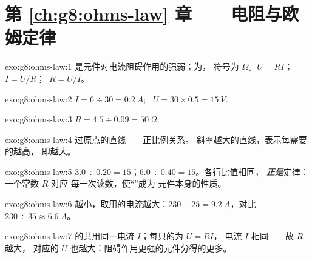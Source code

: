 \section*{第 \ref{ch:g8:ohms-law} 章——电阻与欧姆定律}

\begin{solution}{exo:g8:ohms-law:1}
是元件对电流阻碍作用的强弱；为，
符号为 $\Omega$。$U = R I$；\ $I = U/R$；\ $R = U/I$。
\end{solution}

\begin{solution}{exo:g8:ohms-law:2}
$I = 6 \div 30 = \qty{0.2}{A}$; \ $U = 30 \times 0.5 =
\qty{15}{V}$.
\end{solution}

\begin{solution}{exo:g8:ohms-law:3}
$R = 4.5 \div 0.09 = 50\,\Omega$.
\end{solution}

\begin{solution}{exo:g8:ohms-law:4}
过原点的直线——正比例关系。
斜率越大的直线，表示每需要的越高，
即越大。
\end{solution}

\begin{solution}{exo:g8:ohms-law:5}
$3.0 \div 0.20 = 15$；$6.0 \div 0.40 = 15$。各行比值相同，
\emph{正是}定律：一个常数 $R$ 对应
每一次读数，使“”成为
元件本身的性质。
\end{solution}

\begin{solution}{exo:g8:ohms-law:6}
越小，取用的电流越大：$230 \div 25 =
\qty{9.2}{A}$，对比 $230 \div 35 \approx \qty{6.6}{A}$。
\end{solution}

\begin{solution}{exo:g8:ohms-law:7}
的共用同一电流 $I$；每只的为 $U = R I$，
电流 $I$ 相同——故 $R$ 越大，
对应的 $U$ 也越大：阻碍作用更强的元件分得的更多。
\end{solution}

